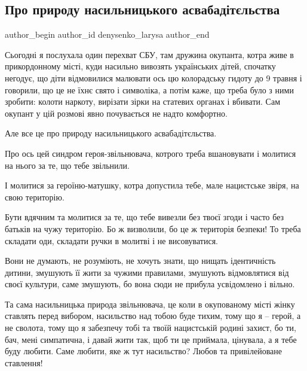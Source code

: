  
 
 
 
 
 
\subsection{Про природу насильницького асвабадітєльства}
\label{sec:11_05_2022.fb.denysenko_larysa.1.nasilnik_osvoboditel}
 
\ifcmt
 author_begin
   author_id denysenko_larysa
 author_end
\fi

Сьогодні я послухала один перехват СБУ, там дружина окупанта, котра живе в
прикордонному місті, куди насильно вивозять українських дітей, спочатку
негодує, що діти відмовилися малювати ось цю колорадську гидоту до 9 травня і
говорили, що це не їхнє свято і символіка, а потім каже, що треба було з ними
зробити: колоти наркоту, вирізати зірки на статевих органах і вбивати. Сам
окупант у цій розмові явно почувається не надто комфортно. 

Але все це про природу насильницького асвабадітєльства.

Про ось цей синдром героя-звільнювача, котрого треба вшановувати і молитися на
нього за те, що тебе звільнили. 

І молитися за героїню-матушку, котра допустила тебе, мале нацистське звіря, на
свою територію. 

Бути вдячним та молитися за те, що тебе вивезли без твоєї згоди і часто без
батьків на чужу територію. Бо ж визволили, бо це ж територія безпеки! То треба
складати оди, складати ручки в молитві і не висовуватися. 

Вони не думають, не розуміють, не хочуть знати, що нищать ідентичність дитини,
змушують її жити за чужими правилами, змушують відмовлятися від своєї культури,
саме змушують, бо вона сюди не прибула усвідомлено і вільно. 

Та сама насильницька природа звільнювача, це коли в окупованому місті жінку
ставлять перед вибором, насильство над тобою буде тихим, тому що я – герой, а
не сволота, тому що я забезпечу тобі та твоїй нацистській родині захист, бо ти,
бач, мені симпатична, і давай жити так, щоб ти це приймала, цінувала, а я тебе
буду любити. Саме любити, яке ж тут насильство? Любов та привілейоване
ставлення! 

